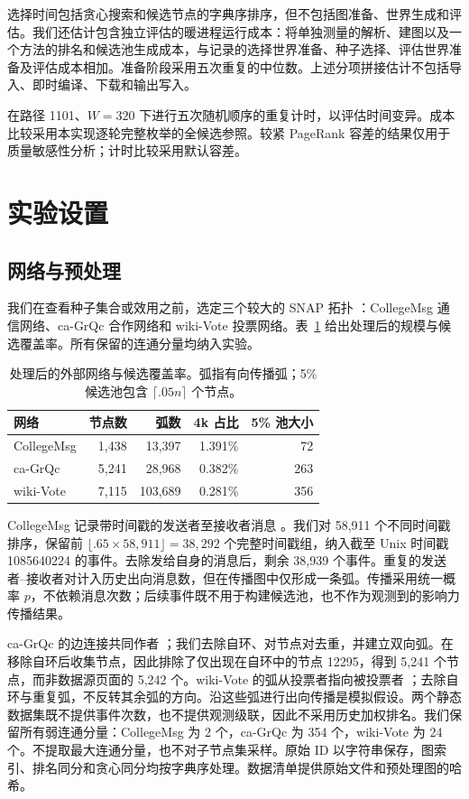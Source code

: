 \documentclass[smallextended]{svjour3}
\begin{document}
选择时间包括贪心搜索和候选节点的字典序排序，但不包括图准备、世界生成和评估。我们还估计包含独立评估的暖进程运行成本：将单独测量的解析、建图以及一个方法的排名和候选池生成成本，与记录的选择世界准备、种子选择、评估世界准备及评估成本相加。准备阶段采用五次重复的中位数。上述分项拼接估计不包括导入、即时编译、下载和输出写入。

在路径 1101、$W=320$ 下进行五次随机顺序的重复计时，以评估时间变异。成本比较采用本实现逐轮完整枚举的全候选参照。较紧 PageRank 容差的结果仅用于质量敏感性分析；计时比较采用默认容差。

\section{实验设置}
\subsection{网络与预处理}
我们在查看种子集合或效用之前，选定三个较大的 SNAP 拓扑 \cite{snap}：CollegeMsg 通信网络、ca-GrQc 合作网络和 wiki-Vote 投票网络。表~\ref{tab:data} 给出处理后的规模与候选覆盖率。所有保留的连通分量均纳入实验。
\begin{table}[htbp]
\caption{处理后的外部网络与候选覆盖率。弧指有向传播弧；5\% 候选池包含 $\lceil .05n\rceil$ 个节点。}\label{tab:data}
\begin{tabular}{lrrrr}
\toprule
网络 & 节点数 & 弧数 & 4k 占比 & 5\% 池大小 \\
\midrule
CollegeMsg & 1,438 & 13,397 & 1.391\% & 72 \\
ca-GrQc & 5,241 & 28,968 & 0.382\% & 263 \\
wiki-Vote & 7,115 & 103,689 & 0.281\% & 356 \\
\bottomrule
\end{tabular}
\end{table}

CollegeMsg 记录带时间戳的发送者至接收者消息 \cite{college}。我们对 58,911 个不同时间戳排序，保留前 $\lfloor .65\times58,911\rfloor=38,292$ 个完整时间戳组，纳入截至 Unix 时间戳 1085640224 的事件。去除发给自身的消息后，剩余 38,939 个事件。重复的发送者--接收者对计入历史出向消息数，但在传播图中仅形成一条弧。传播采用统一概率 $p$，不依赖消息次数；后续事件既不用于构建候选池，也不作为观测到的影响力传播结果。

ca-GrQc 的边连接共同作者 \cite{grqc}；我们去除自环、对节点对去重，并建立双向弧。在移除自环后收集节点，因此排除了仅出现在自环中的节点 12295，得到 5,241 个节点，而非数据源页面的 5,242 个。wiki-Vote 的弧从投票者指向被投票者 \cite{signed,links}；去除自环与重复弧，不反转其余弧的方向。沿这些弧进行出向传播是模拟假设。两个静态数据集既不提供事件次数，也不提供观测级联，因此不采用历史加权排名。我们保留所有弱连通分量：CollegeMsg 为 2 个，ca-GrQc 为 354 个，wiki-Vote 为 24 个。不提取最大连通分量，也不对子节点集采样。原始 ID 以字符串保存，图索引、排名同分和贪心同分均按字典序处理。数据清单提供原始文件和预处理图的哈希。
\end{document}
